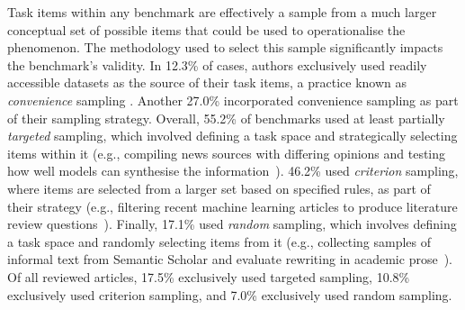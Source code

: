 Task items within any benchmark are effectively a sample from a much larger conceptual set of possible items that could be used to operationalise the phenomenon. The methodology used to select this sample significantly impacts the benchmark's validity. In 12.3\% of cases, authors exclusively used readily accessible datasets as the source of their task items, a practice known as \emph{convenience} sampling \cite{alvi2016manual}. Another 27.0\% incorporated convenience sampling as part of their sampling strategy. Overall, 55.2\% of benchmarks used at least partially \emph{targeted} sampling, which involved defining a task space and strategically selecting items within it (e.g., compiling news sources with differing opinions and testing how well models can synthesise the information~\cite{huangEmbraceDivergenceRicher2024}). 46.2\% used \emph{criterion} sampling, where items are selected from a larger set based on specified rules, as part of their strategy (e.g., filtering recent machine learning articles to produce literature review questions~\cite{ajithLitSearchRetrievalBenchmark2024}). Finally, 17.1\% used \emph{random} sampling, which involves defining a task space and randomly selecting items from it (e.g., collecting samples of informal text from Semantic Scholar and evaluate rewriting in academic prose~\cite{diaoDoolittleBenchmarksCorpora2023a}). Of all reviewed articles, 17.5\% exclusively used targeted sampling, 10.8\% exclusively used criterion sampling, and 7.0\% exclusively used random sampling. 





	



